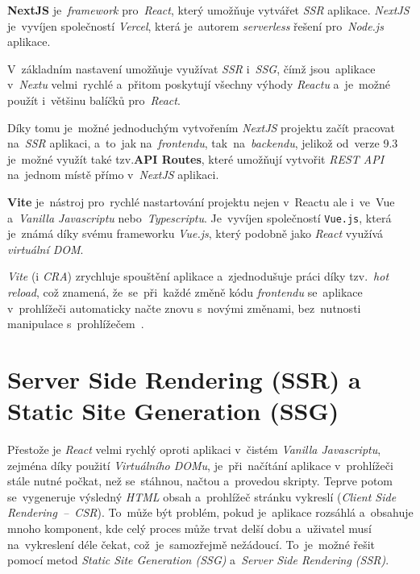 \documentclass[11pt,a4paper]{report}
\begin{document}
            \textbf{NextJS} je~\emph{framework} pro~\emph{React}, který umožňuje vytvářet \emph{SSR} aplikace. \emph{NextJS} je~vyvíjen společností \emph{Vercel}, která je~autorem \emph{serverless} řešení pro~\emph{Node.js} aplikace.

            V~základním nastavení umožňuje využívat \emph{SSR} i~\emph{SSG}, čímž jsou~aplikace v~\emph{Nextu} velmi~rychlé a~přitom poskytují všechny výhody \emph{Reactu} a~je~možné použít i~většinu balíčků pro~\emph{React}.

            Díky tomu je~možné jednoduchým vytvořením \emph{NextJS} projektu začít pracovat na~\emph{SSR} aplikaci, a~to~jak na~\emph{frontendu}, tak~na~\emph{backendu}, jelikož od~verze 9.3 je~možné využít také tzv.\textbf{API Routes}, které umožňují vytvořit \emph{REST API} na~jednom místě přímo v~\emph{NextJS} aplikaci. \cite{nextjs, nextjs-api-routes, nextjs-changelog-9-3}

            \textbf{Vite} je~nástroj pro~rychlé nastartování projektu nejen v~Reactu ale i~ve~Vue a~\emph{Vanilla Javascriptu} nebo~\emph{Typescriptu}. Je~vyvíjen společností \texttt{Vue.js}, která je~známá díky svému frameworku \emph{Vue.js}, který podobně jako \emph{React} využívá \emph{virtuální DOM}.

            \emph{Vite} (i \emph{CRA}) zrychluje spouštění aplikace a~zjednodušuje práci díky tzv.~\emph{hot reload}, což znamená, že~se~při~každé změně kódu \emph{frontendu} se~aplikace v~prohlížeči automaticky načte znovu s~novými změnami, bez~nutnosti manipulace s~prohlížečem~\cite{vitejs}.

        \section{Server Side Rendering (SSR) a Static Site Generation (SSG)}
            Přestože je \emph{React} velmi rychlý oproti aplikaci v~čistém \emph{Vanilla Javascriptu}, zejména díky použití \emph{Virtuálního DOMu}, je~při~načítání aplikace v~prohlížeči stále nutné počkat, než se~stáhnou, načtou a~provedou skripty. Teprve potom se~vygeneruje výsledný \emph{HTML} obsah a~prohlížeč stránku vykreslí (\emph{Client Side Rendering~--~CSR})\cite{mediumWhatCSR}. To~může být problém, pokud je~aplikace rozsáhlá a~obsahuje mnoho komponent, kde celý proces může trvat delší dobu a~uživatel musí na~vykreslení déle čekat, což~je~samozřejmě nežádoucí. To~je~možné řešit pomocí metod \emph{Static Site Generation (SSG)} a~\emph{Server Side Rendering (SSR)}.
\end{document}
